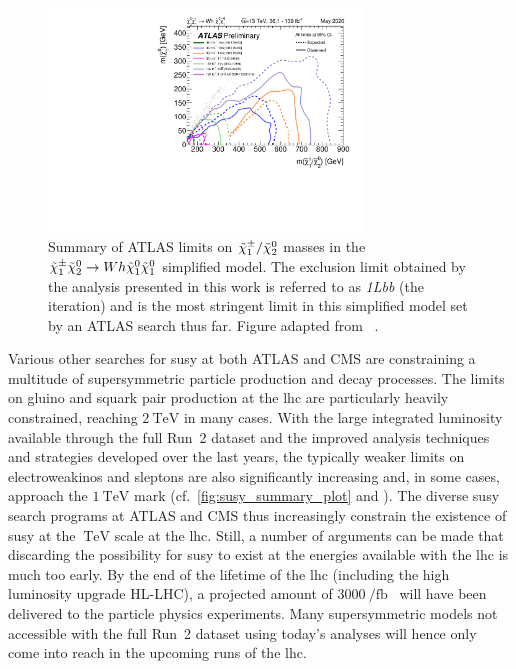  \begin{figure}
	\centering\includegraphics[width=0.75\textwidth]{fig_15}
	\caption{Summary of ATLAS limits on $\tilde{\chi}_1^\pm/\tilde{\chi}_2^0$ masses in the $\tilde{\chi}_1^\pm\tilde{\chi}_2^0\rightarrow Wh\tilde{\chi}_1^0\tilde{\chi}_1^0$ simplified model. The exclusion limit obtained by the analysis presented in this work is referred to as \textit{1Lbb} (the \onethirtynineifb iteration) and is the most stringent limit in this simplified model set by an ATLAS search thus far. Figure adapted from ~\cite{ATL-PHYS-PUB-2020-020}.}
	\label{fig:result_wh_summary}
\end{figure}

Various other searches for \gls{susy} at both ATLAS and CMS are constraining a multitude of supersymmetric particle production and decay processes. The limits on gluino and squark pair production at the \gls{lhc} are particularly heavily constrained, reaching $\SI{2}{\TeV}$ in many cases. With the large integrated luminosity available through the full Run~2 dataset and the improved analysis techniques and strategies developed over the last years, the typically weaker limits on electroweakinos and sleptons are also significantly increasing and, in some cases, approach the $\SI{1}{\TeV}$ mark (cf.~\cref{fig:susy_summary_plot} and \cite{ATL-PHYS-PUB-2020-020,SUSY-2018-32}). The diverse \gls{susy} search programs at ATLAS and CMS thus increasingly constrain the existence of \gls{susy} at the $\SI{}{\TeV}$ scale at the \gls{lhc}. 
Still, a number of arguments can be made that discarding the possibility for \gls{susy} to exist at the energies available with the \gls{lhc} is much too early. By the end of the lifetime of the \gls{lhc} (including the high luminosity upgrade HL-LHC), a projected amount of $\SI{3000}{\per\femto\barn}$~\cite{Apollinari:2116337} will have been delivered to the particle physics experiments. 
Many supersymmetric models not accessible with the full Run~2 dataset using today's analyses will hence only come into reach in the upcoming runs of the \gls{lhc}.

